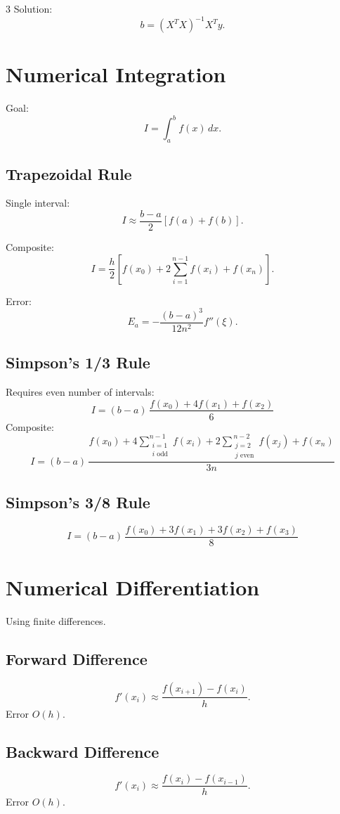 \documentclass[9pt,a4paper]{article}
\begin{document}
\begin{multicols}{3}
Solution:
\[
b = (X^T X)^{-1} X^T y.
\]

\section{Numerical Integration}

Goal:
\[
I=\int_a^b f(x)\,dx.
\]

\subsection{Trapezoidal Rule}
Single interval:
\[
I\approx\frac{b-a}{2}[f(a)+f(b)].
\]

Composite:
\[
I=\frac{h}{2}[f(x_0)+2\sum_{i=1}^{n-1}f(x_i)+f(x_n)].
\]

Error:
\[
E_a=-\frac{(b-a)^3}{12n^2}f''(\xi).
\]

\subsection{Simpson's 1/3 Rule}
Requires even number of intervals:\
\[
I = (b - a)\,\frac{f(x_0) + 4f(x_1) + f(x_2)}{6}
\]
Composite:\
\[
I = (b - a)\,
\frac{
    f(x_0)
    + 4 \sum_{\substack{i = 1 \\ i \text{ odd}}}^{n-1} f(x_i)
    + 2 \sum_{\substack{j = 2 \\ j \text{ even}}}^{\,n-2} f(x_j)
    + f(x_n)
}{3n}
\]

\subsection{Simpson's 3/8 Rule}
\[
I = (b - a)\,\frac{f(x_0) + 3f(x_1) + 3f(x_2) + f(x_3)}{8}
\]


\section{Numerical Differentiation}

Using finite differences.

\subsection{Forward Difference}
\[
f'(x_i)\approx\frac{f(x_{i+1})-f(x_i)}{h}.
\]
Error $O(h)$.

\subsection{Backward Difference}
\[
f'(x_i)\approx\frac{f(x_i)-f(x_{i-1})}{h}.
\]
Error $O(h)$.


\end{multicols}
\end{document}

